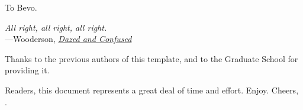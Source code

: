 

\copyrightpage  %

\commcertpage   %

\titlepage      %


\begin{dedication}		%
To Bevo.
\end{dedication}

\begin{epigraph}		%
\begin{center}
    \textit{All right, all right, all right.}
    \\\quad---Wooderson, \href{https://www.imdb.com/title/tt0106677}{\emph{Dazed and Confused}}
\end{center}
\end{epigraph}

\begin{acknowledgments}		%
Thanks to the previous authors of this template, and to the Graduate School for providing it.
\end{acknowledgments}

\begin{preface}		%
Readers, this document represents a great deal of time and effort. Enjoy. Cheers, \theauthor.
\end{preface}

%
\utabstract


